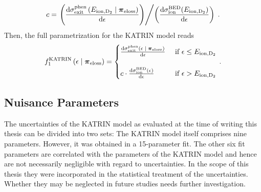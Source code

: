 \begin{equation}
c = \left.	
	\left(
		\katrinElossPhen{\ionEnergyDeu}
	\right)
\middle/
	\left(
		\katrinElossBDE{\ionEnergyDeu}
	\right)
\right.
\fullstop
\end{equation}
Then, the full parametrization for the KATRIN model reads~\cite{Hannen2019_1}
\begin{equation}
	f_1^\mathrm{KATRIN}
	\giventhat*{\epsilon}{\nuisanceParamVec_\mathrm{eloss}} = 
	\begin{cases}
	\katrinElossPhen{\epsilon}
	&\text{ if } \epsilon \leq E_\mathrm{ion,D_2} \\
	\vphantom{.} & \\
	c \cdot \katrinElossBDE{\epsilon} 
	&\text{ if } \epsilon > E_\mathrm{ion,D_2}
	\end{cases}
	\fullstop
\end{equation}

\subsection{Nuisance Parameters}
The uncertainties of the KATRIN model as evaluated at the time of writing this thesis can be divided into two sets: The KATRIN model itself comprises nine parameters. However, it was obtained in a 15-parameter fit. The other six fit parameters are correlated with the parameters of the KATRIN model and hence are not necessarily negligible with regard to uncertainties. In the scope of this thesis they were incorporated in the statistical treatment of the uncertainties. Whether they may be neglected in future studies needs further investigation. 

